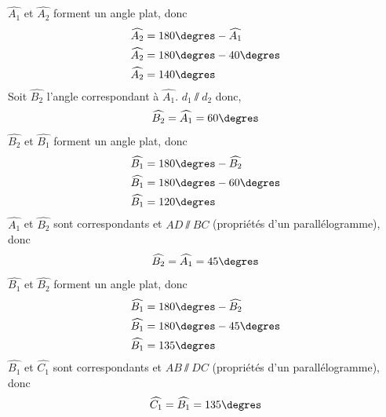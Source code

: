 \documentclass[a4paper,fontsize=12pt, parskip=half]{scrartcl}
\begin{document}
\begin{solution}
    \begin{tasks}
        \task
        $\widehat{A_1}$ et $\widehat{A_2}$ forment un angle plat, donc
        \begin{align*}
            \widehat{A_2} & = 180\degres - \widehat{A_1} \\
            \widehat{A_2} & = 180\degres - 40\degres     \\
            \widehat{A_2} & = 140\degres                 \\
        \end{align*}
        \task
        Soit $\widehat{B_2}$ l'angle correspondant à $\widehat{A_1}$.
        $d_1\sslash d_2$ donc,
        \begin{equation*}
            \widehat{B_2} = \widehat{A_1} = 60\degres
        \end{equation*}
        $\widehat{B_2}$ et $\widehat{B_1}$ forment un angle plat, donc
        \begin{align*}
            \widehat{B_1} & = 180\degres - \widehat{B_2} \\
            \widehat{B_1} & = 180\degres - 60\degres     \\
            \widehat{B_1} & = 120\degres                 \\
        \end{align*}
        \task
        $\widehat{A_1}$ et $\widehat{B_2}$ sont correspondants et
        $AD\sslash BC$ (propriétés d'un parallélogramme), donc
        \begin{equation*}
            \widehat{B_2}=\widehat{A_1}=45\degres
        \end{equation*}
        $\widehat{B_1}$ et $\widehat{B_2}$ forment un angle plat, donc
        \begin{align*}
            \widehat{B_1} & = 180\degres - \widehat{B_2} \\
            \widehat{B_1} & = 180\degres - 45\degres     \\
            \widehat{B_1} & = 135\degres                 \\
        \end{align*}
        $\widehat{B_1}$ et $\widehat{C_1}$ sont correspondants et
        $AB\sslash DC$ (propriétés d'un parallélogramme), donc
        \begin{equation*}
            \widehat{C_1}=\widehat{B_1}=135\degres
        \end{equation*}
    \end{tasks}
    \pagebreak
\end{solution}
\end{document}
